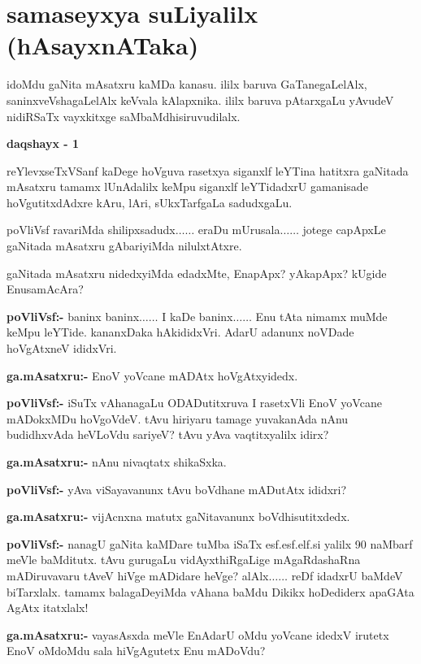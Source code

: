 \chapter{samaseyxya suLiyalilx (hAsayxnATaka)} 

idoMdu gaNita mAsatxru kaMDa kanasu. ililx baruva GaTanegaLelAlx, saninxveVshagaLelAlx keVvala kAlapxnika. ililx baruva pAtarxgaLu yAvudeV nidiRSaTx vayxkitxge saMbaMdhisiruvudilalx. 

\begin{center}
{\bf  daqshayx - {\rm 1}}
\end{center}

reYlevxseTxVSanf kaDege hoVguva rasetxya siganxlf leYTina hatitxra gaNitada mAsatxru tamamx lUnAdalilx keMpu siganxlf leYTidadxrU gamanisade hoVgutitxdAdxre kAru, lAri, sUkxTarfgaLa sadudxgaLu.

poVliVsf ravariMda shilipxsadudx$\ldots\ldots$ eraDu mUrusala$\ldots\ldots$ jotege capApxLe gaNitada mAsatxru gAbariyiMda nilulxtAtxre.

gaNitada mAsatxru nidedxyiMda edadxMte, EnapApx? yAkapApx? kUgide Enu\-samAcAra?

\noindent
\textbf{poVliVsf:-} baninx baninx$\ldots\ldots$ I kaDe baninx$\ldots\ldots$ Enu tAta nimamx muMde keMpu leYTide. kananxDaka hAkididxVri. AdarU adanunx noVDade hoVgAtxneV ididxVri.

\smallskip
\noindent
\textbf{ga.mAsatxru:-} EnoV yoVcane mADAtx hoVgAtxyidedx.

\smallskip
\noindent
\textbf{poVliVsf:-} iSuTx vAhanagaLu ODADutitxruva I rasetxVli EnoV yoVcane mADokxMDu hoVgoVdeV. tAvu hiriyaru tamage yuvakanAda nAnu budidhxvAda heVLoVdu sariyeV? tAvu yAva vaqtitxyalilx idirx?

\smallskip
\noindent
\textbf{ga.mAsatxru:-} nAnu nivaqtatx shikaSxka.

\smallskip
\noindent
\textbf{poVliVsf:-} yAva viSayavanunx tAvu boVdhane mADutAtx ididxri?

\smallskip
\noindent
\textbf{ga.mAsatxru:-} vijAcnxna matutx gaNitavanunx boVdhisutitxdedx.

\smallskip
\noindent
\textbf{poVliVsf:-} nanagU gaNita kaMDare tuMba iSaTx esf.esf.elf.si yalilx {\rm 90} naMbarf meVle baMditutx. tAvu gurugaLu vidAyxthiRgaLige mAgaRdashaRna mADiruvavaru tAveV hiVge mADidare heVge? alAlx$\ldots\ldots$ reDf idadxrU baMdeV biTarxlalx. tamamx balagaDeyiMda vAhana baMdu Dikikx hoDediderx apaGAta AgAtx itatxlalx!

\smallskip
\noindent
\textbf{ga.mAsatxru:-} vayasAsxda meVle EnAdarU oMdu yoVcane idedxV irutetx EnoV oMdoMdu sala hiVgAgutetx Enu mADoVdu?

